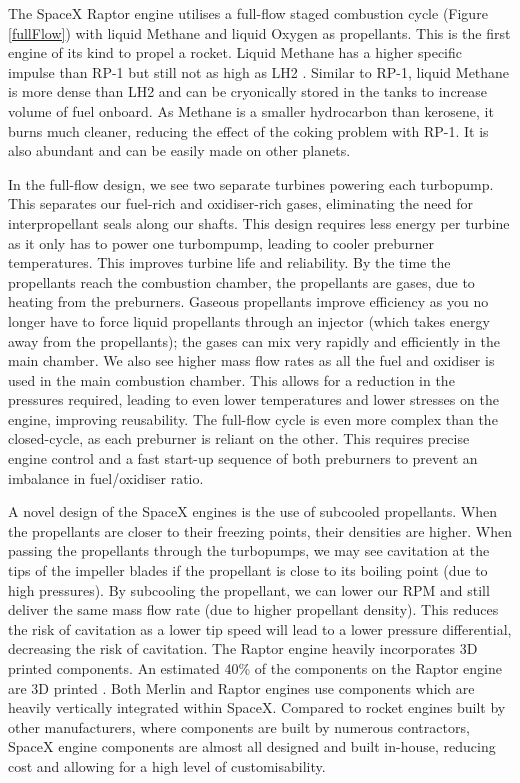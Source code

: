 \documentclass[11pt]{article}
\numberwithin{equation}{section}
\begin{document}
The SpaceX Raptor engine utilises a full-flow staged combustion cycle (Figure \ref{fullFlow}) with liquid Methane and liquid Oxygen as propellants. This is the first engine of its kind to propel a rocket. Liquid Methane has a higher specific impulse than RP-1 but still not as high as LH2 \cite{b1}. Similar to RP-1, liquid Methane is more dense than LH2 and can be cryonically stored in the tanks to increase volume of fuel onboard. As Methane is a smaller hydrocarbon than kerosene, it burns much cleaner, reducing the effect of the coking problem with RP-1. It is also abundant and can be easily made on other planets.

In the full-flow design, we see two separate turbines powering each turbopump. This separates our fuel-rich and oxidiser-rich gases, eliminating the need for interpropellant seals along our shafts. This design requires less energy per turbine as it only has to power one turbompump, leading to cooler preburner temperatures. This improves turbine life and reliability. By the time the propellants reach the combustion chamber, the propellants are gases, due to heating from the preburners. Gaseous propellants improve efficiency as you no longer have to force liquid propellants through an injector (which takes energy away from the propellants); the gases can mix very rapidly and efficiently in the main chamber. We also see higher mass flow rates as all the fuel and oxidiser is used in the main combustion chamber. This allows for a reduction in the pressures required, leading to even lower temperatures and lower stresses on the engine, improving reusability. The full-flow cycle is even more complex than the closed-cycle, as each preburner is reliant on the other. This requires precise engine control and a fast start-up sequence of both preburners to prevent an imbalance in fuel/oxidiser ratio.

A novel design of the SpaceX engines is the use of subcooled propellants. When the propellants are closer to their freezing points, their densities are higher. When passing the propellants through the turbopumps, we may see cavitation at the tips of the impeller blades if the propellant is close to its boiling point (due to high pressures). By subcooling the propellant, we can lower our RPM and still deliver the same mass flow rate (due to higher propellant density). This reduces the risk of cavitation as a lower tip speed will lead to a lower pressure differential, decreasing the risk of cavitation. The Raptor engine heavily incorporates 3D printed components. An estimated 40\% of the components on the Raptor engine are 3D printed \cite{b7}. Both Merlin and Raptor engines use components which are heavily vertically integrated within SpaceX. Compared to rocket engines built by other manufacturers, where components are built by numerous contractors, SpaceX engine components are almost all designed and built in-house, reducing cost and allowing for a high level of customisability.
\end{document}
